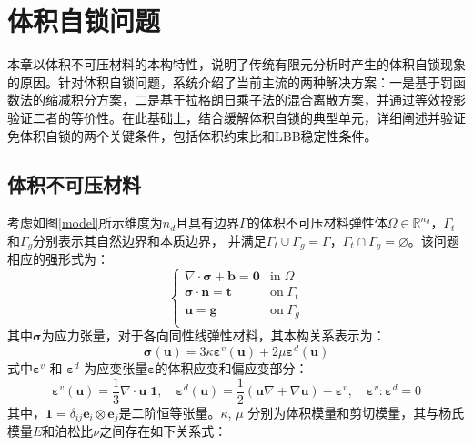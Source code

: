 \chapter{体积自锁问题}
本章以体积不可压材料的本构特性，说明了传统有限元分析时产生的体积自锁现象的原因。针对体积自锁问题，系统介绍了当前主流的两种解决方案：一是基于罚函数法的缩减积分方案，二是基于拉格朗日乘子法的混合离散方案，并通过等效投影验证二者的等价性。在此基础上，结合缓解体积自锁的典型单元，详细阐述并验证免体积自锁的两个关键条件，包括体积约束比和LBB稳定性条件。

\section{体积不可压材料}               
考虑如图\ref{model}所示维度为$n_d$且具有边界$\Gamma$的体积不可压材料弹性体$\Omega\in \mathbb R^{n_d}$，$\Gamma_t$和$\Gamma_g$分别表示其自然边界和本质边界，
并满足$\Gamma_t \cup \Gamma_g = \Gamma$，$\Gamma_t \cap \Gamma_g = \varnothing$。该问题相应的强形式为：
\begin{equation}\label{strong_penalty}
    \begin{cases}
        \nabla \cdot \boldsymbol \sigma + \boldsymbol b = \boldsymbol 0 & \mathrm{in} \; \Omega \\
        \boldsymbol \sigma \cdot \boldsymbol n = \boldsymbol t & \mathrm{on} \; \Gamma_t \\
        \boldsymbol u = \boldsymbol g & \mathrm{on} \; \Gamma_g \\
\end{cases}
\end{equation}
其中$\boldsymbol \sigma$为应力张量，对于各向同性线弹性材料，其本构关系表示为：
\begin{equation}\label{stress_penalty}
    \boldsymbol \sigma(\boldsymbol u) = 3\kappa \boldsymbol \varepsilon^v(\boldsymbol u) + 2\mu \boldsymbol \varepsilon^d(\boldsymbol u) 
\end{equation}
式中$\boldsymbol \varepsilon^v$ 和 $\boldsymbol \varepsilon^d$ 为应变张量$\boldsymbol \varepsilon$的体积应变和偏应变部分：
\begin{equation}
    \boldsymbol \varepsilon^v(\boldsymbol u) =\frac{1}{3} \nabla \cdot \boldsymbol u \; \boldsymbol 1, \quad
    \boldsymbol \varepsilon^d(\boldsymbol u) =\frac{1}{2}(\boldsymbol u \nabla + \nabla \boldsymbol u) - \boldsymbol \varepsilon^v, \quad
    \boldsymbol \varepsilon^v : \boldsymbol \varepsilon^d = 0
\end{equation}
其中，$\boldsymbol 1 = \delta_{ij} \boldsymbol e_i \otimes \boldsymbol e_j$是二阶恒等张量。$\kappa$, $\mu$ 分别为体积模量和剪切模量，其与杨氏模量$E$和泊松比$\nu$之间存在如下关系式：
